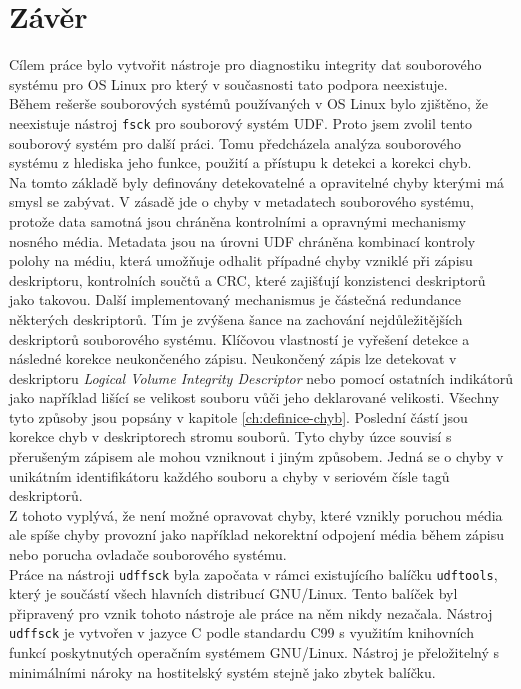 \chapter{Závěr}
Cílem práce bylo vytvořit nástroje pro diagnostiku integrity dat souborového systému pro OS Linux pro který v současnosti tato podpora neexistuje.\\
Během rešerše souborových systémů používaných v OS Linux bylo zjištěno, že neexistuje nástroj \texttt{fsck} pro souborový systém UDF. Proto jsem zvolil tento souborový systém pro další práci. Tomu předcházela analýza souborového systému z hlediska jeho funkce, použití a přístupu k detekci a korekci chyb.\\
Na tomto základě byly definovány detekovatelné a opravitelné chyby kterými má smysl se zabývat. V zásadě jde o chyby v metadatech souborového systému, protože data samotná jsou chráněna kontrolními a opravnými mechanismy nosného média. Metadata jsou na úrovni UDF chráněna kombinací kontroly polohy na médiu, která umožňuje odhalit případné chyby vzniklé při zápisu deskriptoru, kontrolních součtů a CRC, které zajišťují konzistenci deskriptorů jako takovou. Další implementovaný mechanismus je částečná redundance některých deskriptorů. Tím je zvýšena šance na zachování nejdůležitějších deskriptorů souborového systému. Klíčovou vlastností je vyřešení detekce a následné korekce neukončeného zápisu. Neukončený zápis lze detekovat v deskriptoru \textit{Logical Volume Integrity Descriptor} nebo pomocí ostatních indikátorů jako například lišící se velikost souboru vůči jeho deklarované velikosti. Všechny tyto způsoby jsou popsány v kapitole \ref{ch:definice-chyb}. Poslední částí jsou korekce chyb v deskriptorech stromu souborů. Tyto chyby úzce souvisí s přerušeným zápisem ale mohou vzniknout i jiným způsobem. Jedná se o chyby v unikátním identifikátoru každého souboru a chyby v seriovém čísle tagů deskriptorů.\\
Z tohoto vyplývá, že není možné opravovat chyby, které vznikly poruchou média ale spíše chyby provozní jako například nekorektní odpojení média během zápisu nebo porucha ovladače souborového systému.\\
Práce na nástroji \texttt{udffsck} byla započata v rámci existujícího balíčku \texttt{udftools}, který je součástí všech hlavních distribucí GNU/Linux. Tento balíček byl připravený pro vznik tohoto nástroje ale práce na něm nikdy nezačala. Nástroj \texttt{udffsck} je vytvořen v jazyce C podle standardu C99 s využitím knihovních funkcí poskytnutých operačním systémem \mbox{GNU/Linux}. Nástroj je přeložitelný s minimálními nároky na hostitelský systém stejně jako zbytek balíčku.\\
